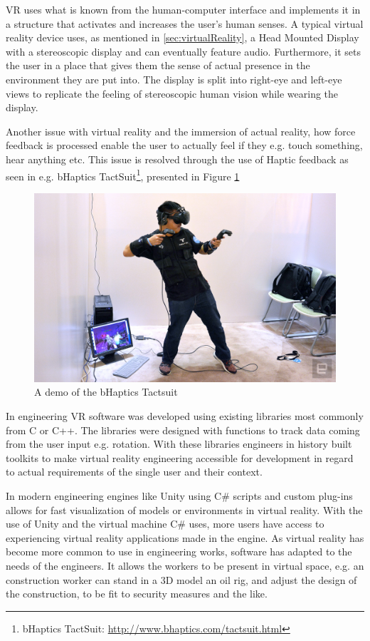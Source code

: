 	VR uses what is known from the human-computer interface and implements it in a structure that activates and increases the user's human senses. A typical virtual reality device uses, as mentioned in \autoref{sec:virtualReality}, a Head Mounted Display with a stereoscopic display and can eventually feature audio. Furthermore, it sets the user in a place that gives them the sense of actual presence in the environment they are put into. The display is split into right-eye and left-eye views to replicate the feeling of stereoscopic human vision while wearing the display. 
	
	Another issue with virtual reality and the immersion of actual reality, how force feedback is processed enable the user to actually feel if they e.g. touch something, hear anything etc. This issue is resolved through the use of Haptic feedback as seen in e.g. bHaptics TactSuit\footnote{bHaptics TactSuit: \url{http://www.bhaptics.com/tactsuit.html}}, presented in Figure \ref{fig:haptics} \\
	\begin{figure}[H]
	\centering
	\includegraphics[width=0.6\linewidth]{figure/Analysis/haptics}
	\caption{A demo of the bHaptics Tactsuit}
	\label{fig:haptics}
	\end{figure}
	In engineering VR software was developed using existing libraries most commonly from C or C++. The libraries were designed with functions to track data coming from the user input e.g. rotation. With these libraries engineers in history built toolkits to make virtual reality engineering accessible for development in regard to actual requirements of the single user and their context. \cite{engineeringVR}
	
	In modern engineering engines like Unity using C\# scripts and custom plug-ins allows for fast visualization of models or environments in virtual reality. With the use of Unity and the virtual machine C\# uses, more users have access to experiencing virtual reality applications made in the engine. As virtual reality has become more common to use in engineering works, software has adapted to the needs of the engineers. It allows the workers to be present in virtual space, e.g. an construction worker can stand in a 3D model an oil rig, and adjust the design of the construction, to be fit to security measures and the like.
	
